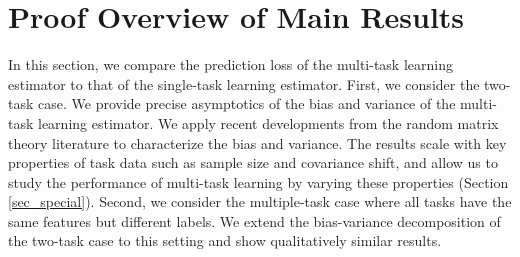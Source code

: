 \section{Proof Overview of Main Results}\label{sec_general}

In this section, we compare the prediction loss of the multi-task learning estimator to that of the single-task learning estimator.
First, we consider the two-task case.
We provide precise asymptotics of the bias and variance of the multi-task learning estimator.
We apply recent developments from the random matrix theory literature to characterize the bias and variance.
The results scale with key properties of task data such as sample size and covariance shift, and allow us to study the performance of multi-task learning by varying these properties (Section \ref{sec_special}).
Second, we consider the multiple-task case where all tasks have the same features but different labels.
We extend the bias-variance decomposition of the two-task case to this setting and show qualitatively similar results.







